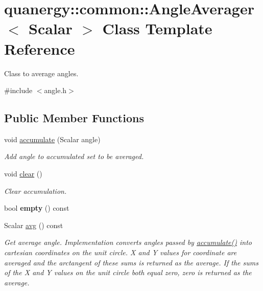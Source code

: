 \hypertarget{classquanergy_1_1common_1_1AngleAverager}{\section{quanergy\-:\-:common\-:\-:Angle\-Averager$<$ Scalar $>$ Class Template Reference}
\label{classquanergy_1_1common_1_1AngleAverager}
}


Class to average angles.  




{\ttfamily \#include $<$angle.\-h$>$}

\subsection*{Public Member Functions}
\begin{DoxyCompactItemize}
\item 
void \hyperlink{classquanergy_1_1common_1_1AngleAverager_aac88135f8afaf698748c79f512636d6f}{accumulate} (Scalar angle)
\begin{DoxyCompactList}\small\item\em Add angle to accumulated set to be averaged. \end{DoxyCompactList}\item 
\hypertarget{classquanergy_1_1common_1_1AngleAverager_ae522aa9e906029066267235ca93b5296}{void \hyperlink{classquanergy_1_1common_1_1AngleAverager_ae522aa9e906029066267235ca93b5296}{clear} ()}\label{classquanergy_1_1common_1_1AngleAverager_ae522aa9e906029066267235ca93b5296}

\begin{DoxyCompactList}\small\item\em Clear accumulation. \end{DoxyCompactList}\item 
\hypertarget{classquanergy_1_1common_1_1AngleAverager_a107400ae1eb2d2036b5f5b6da60fa987}{bool {\bfseries empty} () const }\label{classquanergy_1_1common_1_1AngleAverager_a107400ae1eb2d2036b5f5b6da60fa987}

\item 
Scalar \hyperlink{classquanergy_1_1common_1_1AngleAverager_a28d2d4a4e4b6ea57311822e51b4ccb5d}{avg} () const 
\begin{DoxyCompactList}\small\item\em Get average angle. Implementation converts angles passed by \hyperlink{classquanergy_1_1common_1_1AngleAverager_aac88135f8afaf698748c79f512636d6f}{accumulate()} into cartesian coordinates on the unit circle. X and Y values for coordinate are averaged and the arctangent of these sums is returned as the average. If the sums of the X and Y values on the unit circle {\itshape both} equal zero, zero is returned as the average. \end{DoxyCompactList}\end{DoxyCompactItemize}


